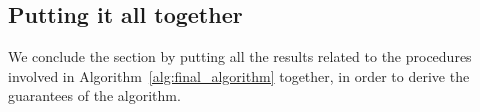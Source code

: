 \subsection{Putting it all together}\label{sec:final_algo}
We conclude the section by putting all the results related to the procedures involved in Algorithm~\ref{alg:final_algorithm} together, in order to derive the guarantees of the algorithm.



